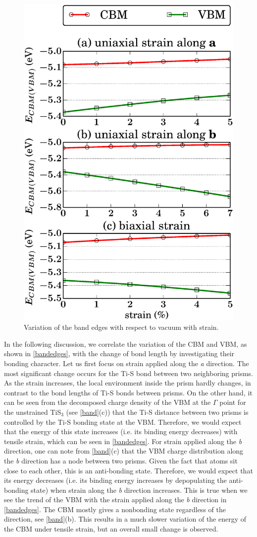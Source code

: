\begin{figure}[htb]
\centering
\includegraphics[width=0.6\linewidth]{Mob_bandedges.eps}
\caption{Variation of the band edges with respect to vacuum with strain. \label{bandedges}}
\end{figure}

In the following discussion, we correlate the variation of the CBM and VBM, as shown in \autoref{bandedges}, with the change of bond length by investigating their bonding character. Let us first focus on strain applied along the \textit{a} direction. The most significant change occurs for the Ti-S bond between two neighboring prisms. As the strain increases, the local environment inside the prism hardly changes, in contrast to the bond lengths of Ti-S bonds between prisms. On the other hand, it can be seen from the decomposed charge density of the VBM at the $\Gamma$ point for the unstrained TiS$_3$ (see \autoref{band}(c)) that the Ti-S distance between two prisms is controlled by the Ti-S bonding state at the VBM. Therefore, we would expect that the energy of this state increases (i.e. its binding energy decreases) with tensile strain, which can be seen in \autoref{bandedges}. For strain applied along the \textit{b} direction, one can note from \autoref{band}(c) that the VBM charge distribution along the \textit{b} direction has a node between two prisms. Given the fact that atoms sit close to each other, this is an  anti-bonding state. Therefore, we would expect that its energy decreases (i.e. its binding energy increases by depopulating the anti-bonding state) when strain along the \textit{b} direction increases. This is true when we see the trend of the VBM with the strain applied along the \textit{b} direction in \autoref{bandedges}. The CBM mostly gives a nonbonding state regardless of the direction, see \autoref{band}(b). This results in a much slower variation of the energy of  the CBM under tensile strain, but an overall small change is observed. 

